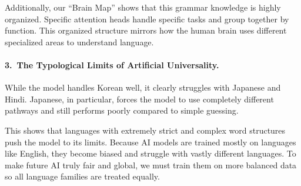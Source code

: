 \documentclass[11pt, a4paper]{article}
\begin{document}
Additionally, our ``Brain Map'' shows that this grammar knowledge is highly organized. Specific attention heads handle specific tasks and group together by function. This organized structure mirrors how the human brain uses different specialized areas to understand language.

\paragraph{3.\ The Typological Limits of Artificial Universality.}
While the model handles Korean well, it clearly struggles with Japanese and Hindi. Japanese, in particular, forces the model to use completely different pathways and still performs poorly compared to simple guessing. 

This shows that languages with extremely strict and complex word structures push the model to its limits. Because AI models are trained mostly on languages like English, they become biased and struggle with vastly different languages. To make future AI truly fair and global, we must train them on more balanced data so all language families are treated equally.
\end{document}
